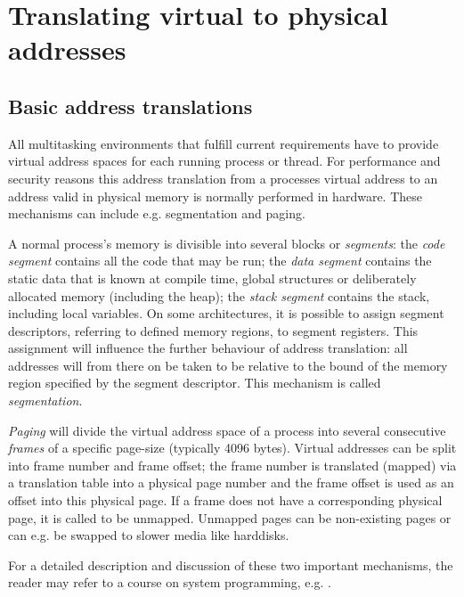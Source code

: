 %
%

\section{Translating virtual to physical addresses}

\label{addresstranslations}

\subsection{Basic address translations}

\label{address_translation} All multitasking environments that fulfill current
requirements have to provide virtual address spaces for each running process or
thread. For performance and security reasons this address translation from a
processes virtual address to an address valid in physical memory is normally
performed in hardware. These mechanisms can include e.g\@. segmentation and
paging.

A normal process's memory is divisible into several blocks or \emph{segments}:
the \emph{code segment} contains all the code that may be run; the \emph{data
segment} contains the static data that is known at compile time, global
structures or deliberately allocated memory (including the heap); the
\emph{stack segment} contains the stack, including local variables. On some
architectures, it is possible to assign segment descriptors, referring to
defined memory regions, to segment registers. This assignment will influence the
further behaviour of address translation: all addresses will from there on be
taken to be relative to the bound of the memory region specified by the segment
descriptor. This mechanism is called \emph{segmentation}.

\emph{Paging} will divide the virtual address space of a process into several
consecutive \emph{frames} of a specific page-size (typically 4096 bytes).
Virtual addresses can be split into frame number and frame offset; the frame
number is translated (mapped) via a translation table into a physical page
number and the frame offset is used as an offset into this physical page. If a
frame does not have a corresponding physical page, it is called to be unmapped.
Unmapped pages can be non-existing pages or can e.g\@. be swapped to slower
media like harddisks.

For a detailed description and discussion of these two important mechanisms, the
reader may refer to a course on system programming, e.g\@.
\cite{rwth_syspro_scriptum:2002}.

